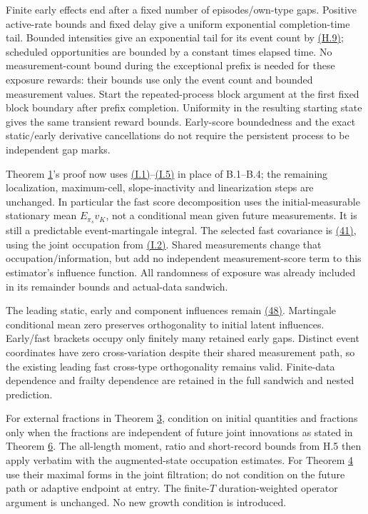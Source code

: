 \documentclass[11pt]{article}
\begin{document}
Finite early effects end after a fixed number of episodes/own-type gaps. Positive active-rate bounds and fixed delay give a uniform exponential completion-time tail. Bounded intensities give an exponential tail for its event count by \hyperref[eq:H.9]{(H.9)}; scheduled opportunities are bounded by a constant times elapsed time. No measurement-count bound during the exceptional prefix is needed for these exposure rewards: their bounds use only the event count and bounded measurement values. Start the repeated-process block argument at the first fixed block boundary after prefix completion. Uniformity in the resulting starting state gives the same transient reward bounds. Early-score boundedness and the exact static/early derivative cancellations do not require the persistent process to be independent gap marks.

Theorem \hyperref[res:Theorem-1]{1}'s proof now uses \hyperref[eq:I.1]{(I.1)}--\hyperref[eq:I.5]{(I.5)} in place of B.1--B.4; the remaining localization, maximum-cell, slope-inactivity and linearization steps are unchanged. In particular the fast score decomposition uses the initial-measurable stationary mean \(E_{\pi_s}v_K\), not a conditional mean given future measurements. It is still a predictable event-martingale integral. The selected fast covariance is \hyperref[eq:41]{(41)}, using the joint occupation from \hyperref[eq:I.2]{(I.2)}. Shared measurements change that occupation/information, but add no independent measurement-score term to this estimator's influence function. All randomness of exposure was already included in its remainder bounds and actual-data sandwich.

The leading static, early and component influences remain \hyperref[eq:48]{(48)}. Martingale conditional mean zero preserves orthogonality to initial latent influences. Early/fast brackets occupy only finitely many retained early gaps. Distinct event coordinates have zero cross-variation despite their shared measurement path, so the existing leading fast cross-type orthogonality remains valid. Finite-data dependence and frailty dependence are retained in the full sandwich and nested prediction.

For external fractions in Theorem \hyperref[res:Theorem-3]{3}, condition on initial quantities and fractions only when the fractions are independent of future joint innovations as stated in Theorem \hyperref[res:Theorem-6]{6}. The all-length moment, ratio and short-record bounds from H.5 then apply verbatim with the augmented-state occupation estimates. For Theorem \hyperref[res:Theorem-4]{4} use their maximal forms in the joint filtration; do not condition on the future path or adaptive endpoint at entry. The finite-\(T\) duration-weighted operator argument is unchanged. No new growth condition is introduced.
\end{document}
